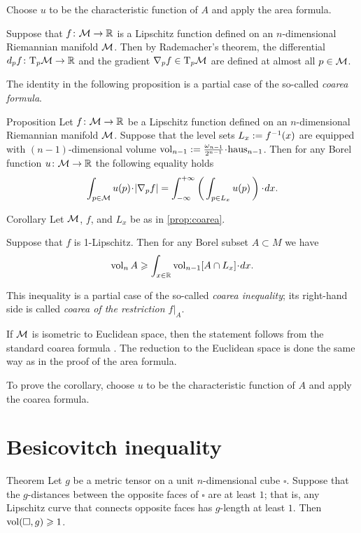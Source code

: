  Choose $u$ to be the characteristic function of $A$ and apply the area formula.
\qeds

Suppose that $f\colon\mathcal{M}\to\mathbb{R}$ is a Lipschitz function defined on an $n$-dimensional Riemannian manifold $\mathcal{M}$.
Then by Rademacher's theorem, the differential $d_pf\colon\mathrm{T}_p\mathcal{M}\to\mathbb{R}$  and the gradient 
$\nabla_pf\in\mathrm{T}_p\mathcal{M}$ are defined at almost all $p\in \mathcal{M}$.

The identity in the following proposition is a partial case of the so-called \emph{coarea formula}.


\begin{thm}{Proposition}\label{prop:coarea}
Let $f\colon\mathcal{M}\to\mathbb{R}$ be a Lipschitz function defined on an $n$-dimensional Riemannian manifold $\mathcal{M}$.
Suppose that the level sets $L_x\mathrel{:=} f^{-1}(x)$ are equipped with $(n-1)$-dimensional volume $\vol_{n-1}\df\tfrac{\omega_{n-1}}{2^{n-1}}\cdot \haus_{n-1}$.
Then for any Borel function $u\colon\mathcal{M}\to \mathbb{R}$ the following equality holds
\[\int_{p\in \spc{M}} u(p)\cdot |\nabla_pf|=\int_{-\infty}^{+\infty} \left(\,\int_{p\in L_x} u(p)\,\right)\cdot dx.\]
\end{thm}


\begin{thm}{Corollary}\label{cor:coarea}
Let $\mathcal{M}$, $f$, and $L_x$ be as in \ref{prop:coarea}.

Suppose that $f$ is 1-Lipschitz.
Then for any Borel subset $A\subset M$ we have
\[\vol_n A\ge \int_{x\in\RR} \vol_{n-1}[A\cap L_x]\cdot dx.\]
\end{thm}

This inequality is a partial case of the so-called  \emph{coarea inequality};
its right-hand side is called \emph{coarea of the restriction $f|_A$}. 


If $\mathcal{M}$ is isometric to Euclidean space, then the statement follows from the standard coarea formula \cite[3.2.12]{federer}.
The reduction to the Euclidean space is done the same way as in the proof of the area formula.

To prove the corollary, choose $u$ to be the characteristic function of $A$ and apply the coarea formula.
\qeds


\section{Besicovitch inequality}

\begin{thm}{Theorem}\label{thm:besikovitch}
Let $g$ be a metric tensor on a unit $n$-dimensional cube $\square$.
Suppose that the $g$-distances between the opposite faces of $\square$ are at least $1$; that is, any Lipschitz curve that connects opposite faces has $g$-length at least $1$.
Then $\operatorname{\rm vol}\nolimits(\square, g)\geqslant 1$.
\end{thm}

